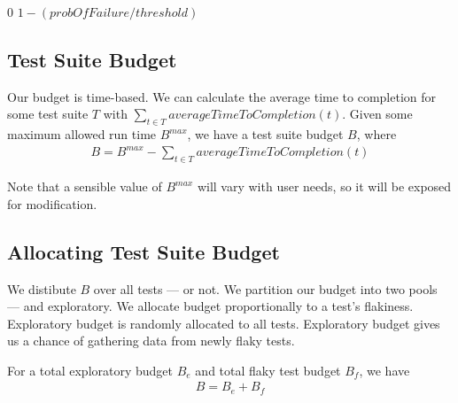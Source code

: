 {\begin{defn}[\Flakiness]
\end{defn}

\begin{algorithm}[h]
\caption{}
\label{alg:calculate_flakiness}

\begin{algorithmic}
	\Require{$probOfFailure$ and $threshold$ are decimal values within ranges
	$[0..1]$ and $(0..1]$ respectively.}
    \Statex


		\State \Return $0$
	\Else
		\State \Return $1 - (probOfFailure / threshold)$
	\EndIf

	\EndFunction
\end{algorithmic}

\end{algorithm}

\subsection{Test Suite Budget}
\label{sec:sec:budget}

Our budget is time-based. We can calculate the average time to completion for
some test suite $T$ with $\sum\limits_{t \in T} averageTimeToCompletion(t)$.
Given some maximum allowed run time $B^{max}$, we have a test suite budget $B$,
where
\begin{align*}
B = B^{max} - \sum\limits_{t \in T} averageTimeToCompletion(t)
\end{align*}

Note that a sensible value of $B^{max}$ will vary with user needs, so it will be
exposed for modification.


\subsection{Allocating Test Suite Budget}
\label{sec:sec:allocating_budget}

We distibute $B$ over all tests --- \flaky or not. We partition our budget into
two pools --- \flaky and exploratory. We allocate \flaky budget proportionally
to a test's flakiness. Exploratory budget is randomly allocated to all tests.
Exploratory budget gives us a chance of gathering data from newly flaky tests.

For a total exploratory budget $B_{e}$ and total flaky test budget $B_{f}$, we
have
\begin{align*}
B = B_{e} + B_{f}
\end{align*}

}
